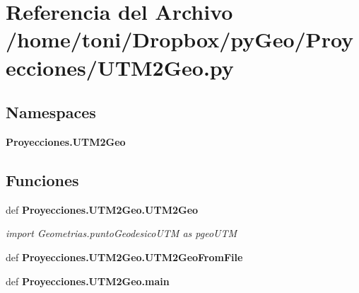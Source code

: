 \section{Referencia del Archivo /home/toni/\-Dropbox/py\-Geo/\-Proyecciones/\-U\-T\-M2\-Geo.py}
\label{UTM2Geo_8py}
\subsection*{Namespaces}
\begin{DoxyCompactItemize}
\item 
{\bf Proyecciones.\-U\-T\-M2\-Geo}
\end{DoxyCompactItemize}
\subsection*{Funciones}
\begin{DoxyCompactItemize}
\item 
def {\bf Proyecciones.\-U\-T\-M2\-Geo.\-U\-T\-M2\-Geo}
\begin{DoxyCompactList}\small\item\em import Geometrias.\-punto\-Geodesico\-U\-T\-M as pgeo\-U\-T\-M \end{DoxyCompactList}\item 
def {\bf Proyecciones.\-U\-T\-M2\-Geo.\-U\-T\-M2\-Geo\-From\-File}
\item 
def {\bf Proyecciones.\-U\-T\-M2\-Geo.\-main}
\end{DoxyCompactItemize}
